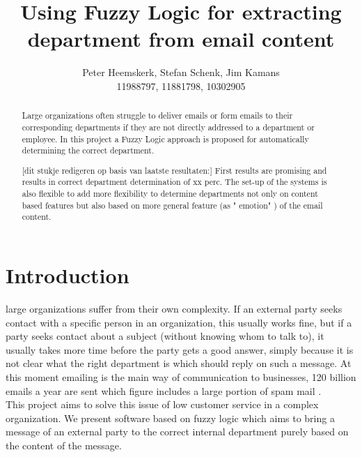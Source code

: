 \documentclass[journal]{IEEEtran}
\begin{document}
\title{Using Fuzzy Logic for extracting department from email content}
\author{Peter Heemskerk, Stefan Schenk, Jim Kamans\\11988797, 11881798, 10302905}


\maketitle

\begin{abstract}
Large organizations often struggle to deliver emails or form emails to their corresponding departments if they are not directly addressed to a department or employee. In this project a Fuzzy Logic approach is proposed for automatically determining the correct department. 

[dit stukje redigeren op basis van laatste resultaten:]
First results are promising and results in correct department determination  of xx perc. The set-up of the systems is also flexible to add more flexibility to determine departments not only on content based features but also based on more general feature (as " emotion" ) of the email content. 

\end{abstract}

\section{Introduction}
 large organizations suffer from their own complexity. If an external party seeks contact with a specific person in an organization, this usually works fine, but if a party seeks contact about a subject (without knowing whom to talk to), it usually takes more time before the party gets a good answer, simply because it is not clear what the right department is which should reply on such a message. At this moment emailing is the main way of communication to businesses, 120 billion emails a year are sent which figure includes a large portion of spam mail \cite{email_statistics}.\\


This project aims to solve this issue of low customer service in a complex organization. We present software based on fuzzy logic which aims to bring a message of an external party to the correct internal department purely based on the content of the message.
\end{document}
